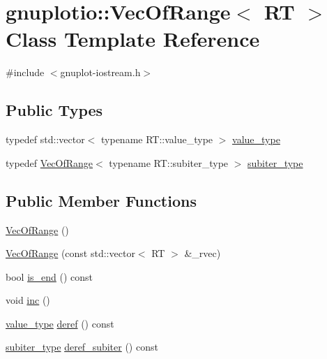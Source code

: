\hypertarget{classgnuplotio_1_1_vec_of_range}{}\section{gnuplotio\+:\+:Vec\+Of\+Range$<$ RT $>$ Class Template Reference}
\label{classgnuplotio_1_1_vec_of_range}


{\ttfamily \#include $<$gnuplot-\/iostream.\+h$>$}

\subsection*{Public Types}
\begin{DoxyCompactItemize}
\item 
typedef std\+::vector$<$ typename R\+T\+::value\+\_\+type $>$ \hyperlink{classgnuplotio_1_1_vec_of_range_aed503f2f8d8ed71b303f2db26872bafd}{value\+\_\+type}
\item 
typedef \hyperlink{classgnuplotio_1_1_vec_of_range}{Vec\+Of\+Range}$<$ typename R\+T\+::subiter\+\_\+type $>$ \hyperlink{classgnuplotio_1_1_vec_of_range_a4cfae20b9797febceffafec3415b52db}{subiter\+\_\+type}
\end{DoxyCompactItemize}
\subsection*{Public Member Functions}
\begin{DoxyCompactItemize}
\item 
\hyperlink{classgnuplotio_1_1_vec_of_range_a077cf69b9ea96d4f0da78a5e72ab2427}{Vec\+Of\+Range} ()
\item 
\hyperlink{classgnuplotio_1_1_vec_of_range_a81e04f9ab4b8641d69df61f695e97e34}{Vec\+Of\+Range} (const std\+::vector$<$ RT $>$ \&\+\_\+rvec)
\item 
bool \hyperlink{classgnuplotio_1_1_vec_of_range_a2beef61aa5b150db9af86b1de2edcb22}{is\+\_\+end} () const 
\item 
void \hyperlink{classgnuplotio_1_1_vec_of_range_a2e5371ab6c88994e3fc6f12324783e1c}{inc} ()
\item 
\hyperlink{classgnuplotio_1_1_vec_of_range_aed503f2f8d8ed71b303f2db26872bafd}{value\+\_\+type} \hyperlink{classgnuplotio_1_1_vec_of_range_aa33d4275110fb0d5d76f56199381740f}{deref} () const 
\item 
\hyperlink{classgnuplotio_1_1_vec_of_range_a4cfae20b9797febceffafec3415b52db}{subiter\+\_\+type} \hyperlink{classgnuplotio_1_1_vec_of_range_a2f2ff571b1ef737f60bb0094e1dc221e}{deref\+\_\+subiter} () const 
\end{DoxyCompactItemize}
